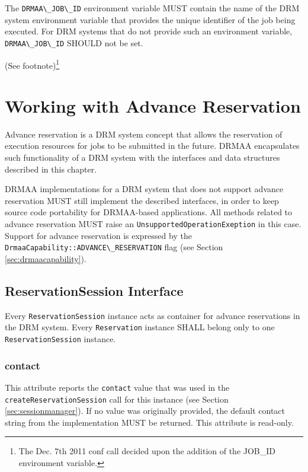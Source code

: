 \documentclass{article}
\newcommand{\h}[1]{\lstinline|#1|}
\newcommand{\rat}[1]{ {\tiny(See footnote)}\footnote{#1} }
\begin{document}
The \h{DRMAA\_JOB\_ID} environment variable MUST contain the name of the DRM system environment variable that provides the unique identifier of the job being executed.  For DRM systems that do not provide such an environment variable,  \h{DRMAA\_JOB\_ID} SHOULD not be set. 

\rat{The Dec. 7th 2011 conf call decided upon the addition of the JOB\_ID environment variable.}

\section{Working with Advance Reservation}

Advance reservation is a DRM system concept that allows the reservation of execution resources for jobs to be submitted in the future. DRMAA encapsulates such functionality of a DRM system with the interfaces and data structures described in this chapter.

DRMAA implementations for a DRM system that does not support advance reservation MUST still implement the described interfaces, in order to keep source code portability for DRMAA-based applications. All methods related to advance reservation MUST raise an \h{UnsupportedOperationExeption} in this case. Support for advance reservation is expressed by the \h{DrmaaCapability::ADVANCE\_RESERVATION} flag (see Section \ref{sec:drmaacapability}). 

\subsection{ReservationSession Interface}
\label{sec:reservationsession}

Every \h{ReservationSession} instance acts as container for advance reservations in the DRM system. Every \h{Reservation} instance SHALL belong only to one \h{ReservationSession} instance. 



\subsubsection{contact}

This attribute reports the \h{contact} value that was used in the \h{createReservationSession} call for this instance (see Section \ref{sec:sessionmanager}). If no value was originally provided, the default contact string from the implementation MUST be returned. This attribute is read-only.
\end{document}

